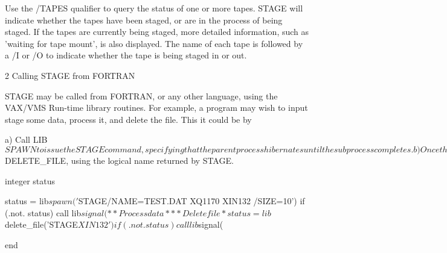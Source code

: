 \begin{XMP}
Use the /TAPES qualifier to query the status of one or more tapes.
STAGE will indicate whether the tapes have been staged, or are in
the process of being staged. If the tapes are currently being staged,
more detailed information, such as 'waiting for tape mount', is also
displayed. The name of each tape is followed by a /I or /O to indicate
whether the tape is being staged in or out.

2 Calling STAGE from FORTRAN

STAGE may be called from FORTRAN, or any other language, using
the VAX/VMS Run-time library routines. For example, a program
may wish to input stage some data, process it, and delete the file.
This it could be by

a) Call LIB$SPAWN to issue the STAGE command, specifying that the
parent process hibernates until the subprocess completes.

b) Once the subprocess has completed, the data will have been staged to
disk, unless a error code is returned.

c) The program can then continue to process this data.

d) Once processing has completed, it can delete the staged file using
LIB$DELETE_FILE, using the logical name returned by STAGE.

      integer status

      status = lib$spawn('$STAGE/NAME=TEST.DAT XQ1170 XIN132 /SIZE=10')
      if (.not. status) call lib$signal(%

*
*      Process data
*

*
*      Delete file
*
      status = lib$delete_file('STAGE$XIN132')
      if (.not. status) call lib$signal(%

      end

\end{XMP}
